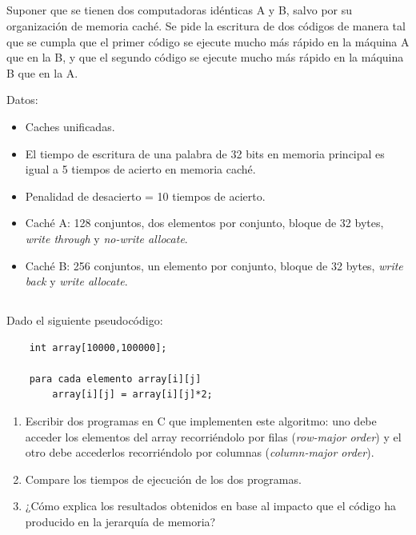 \subsection{}
Suponer que se tienen dos computadoras idénticas A y B, salvo por su organización de memoria caché. Se pide la escritura de dos códigos de manera tal que se cumpla que el primer código se ejecute mucho más rápido en la máquina A que en la B, y que el segundo código se ejecute mucho más rápido en la máquina B que en la A.

Datos:

\begin{itemize}
 \item Caches unificadas.
 \item El tiempo de escritura de una palabra de 32 bits en memoria principal es igual a 5 tiempos de acierto en memoria caché.
 \item Penalidad de desacierto = 10 tiempos de acierto. 
 \item Caché A: 128 conjuntos, dos elementos por conjunto, bloque de 32 bytes, \textit{write through} y \textit{no-write allocate}.
 \item Caché B: 256 conjuntos, un elemento por conjunto, bloque de 32 bytes, \textit{write back} y \textit{write allocate}.
\end{itemize}

\subsection{}
Dado el siguiente pseudocódigo:

\small
\begin{verbatim}
    int array[10000,100000];

    para cada elemento array[i][j]
        array[i][j] = array[i][j]*2;
\end{verbatim}
\normalsize

\begin{enumerate}
 \item Escribir dos programas en C que implementen este algoritmo: uno debe acceder los elementos del array recorriéndolo por filas (\textit{row-major order}) y el otro debe accederlos recorriéndolo por columnas (\textit{column-major order}).
 \item Compare los tiempos de ejecución de los dos programas.
 \item ¿Cómo explica los resultados obtenidos en base al impacto que el código ha producido en la jerarquía de memoria? 
\end{enumerate}

